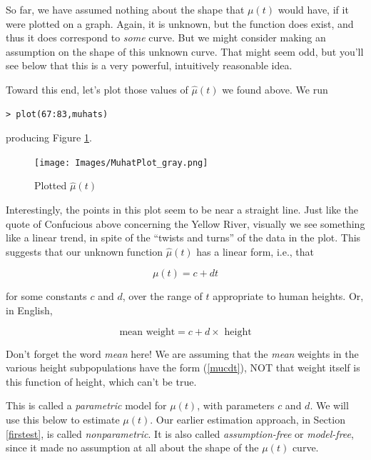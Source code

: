 So far, we have assumed nothing about the shape that $\mu(t)$ would have,
if it were plotted on a graph.  Again, it is unknown, but the function
does exist, and thus it does correspond to {\it some} curve.  But we
might consider making an assumption on the shape of this unknown curve.
That might seem odd, but you'll see below that this is a very powerful,
intuitively reasonable idea.

Toward this end, let's plot those values of $\widehat{\mu}(t)$ we found
above.  We run

\begin{lstlisting}
> plot(67:83,muhats)
\end{lstlisting}

producing Figure \ref{muhatplot}.

\begin{figure}
\centerline{
\texttt{[image: Images/MuhatPlot\_gray.png]}
}
\caption{Plotted $\widehat{\mu}(t)$}
\label{muhatplot}
\end{figure}

Interestingly, the points in this plot seem to be near a straight line.
Just like the quote of Confucious above concerning the Yellow River,
visually we see something like a linear trend, in spite of the ``twists
and turns'' of the data in the plot.  This suggests that our unknown
function $\widehat{\mu}(t)$ has a linear form, i.e., that

\begin{equation}
\label{mucdt}
\mu(t) = c + d t
\end{equation}

for some constants $c$ and $d$, over the range of $t$ appropriate to
human heights.  Or, in English,

\begin{equation}
\label{englishlinear}
\textrm{mean weight} = c + d \times \textrm{ height}
\end{equation}

Don't forget the word {\it mean} here!  We are assuming that the {\it mean}
weights in the various height subpopulations have the form (\ref{mucdt}),
NOT that weight itself is this function of height, which can't be true.

This is called a {\it parametric} model for $\mu(t)$, with parameters
$c$ and $d$.  We will use this below to estimate $\mu(t)$.  Our earlier
estimation approach, in Section \ref{firstest}, is called {\it
nonparametric}.  It is also called {\it assumption-free} or {\it
model-free}, since it made no assumption at all about the shape of the
$\mu(t)$ curve.

